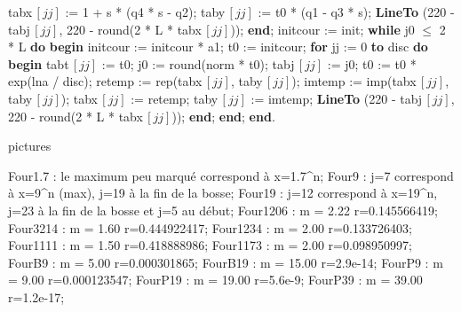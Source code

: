 {   tabx$\, [jj]$ := 1 + s * (q4 * s - q2);
   taby$\, [jj]$ := t0 * (q1 - q3 * s);
   {\bf LineTo} (220 - tabj$\, [jj]$, 220 - round(2 * L * tabx$\, [jj]$));
  {\bf end};
\medskip
 initcour := init;
\medskip
 {\bf while} j0 $\leq$ 2 * L {\bf do}
\smallskip
  {\bf begin}
   initcour := initcour * a1;
   t0 := initcour;
   {\bf for} jj := 0 {\bf to} disc {\bf do}
\smallskip
    {\bf begin}
     tabt$\, [jj]$ := t0;
     j0 := round(norm * t0);
     tabj$\, [jj]$ := j0;
     t0 := t0 * exp(lna / disc);
     retemp := rep(tabx$\, [jj]$, taby$\, [jj]$);
     imtemp := imp(tabx$\, [jj]$, taby$\, [jj]$);
     tabx$\, [jj]$ := retemp;
     taby$\, [jj]$ := imtemp;
     {\bf LineTo} (220 - tabj$\, [jj]$, 220 - round(2 * L * tabx$\, [jj]$));
    {\bf end};
\medskip
  {\bf end};
\medskip
{\bf end}.

} %

\vfill\break




\bye

 pictures 

Four1.7  : le maximum peu marqu\'e correspond \`a x=1.7^n;
Four9  : j=7 correspond \`a x=9^n (max), j=19 \`a la fin de la bosse;
Four19  : j=12 correspond \`a x=19^n, j=23 \`a la fin de la bosse
et j=5 au d\'ebut;
Four1206  : m = 2.22    r=0.145566419;
Four3214  : m = 1.60    r=0.444922417;
Four1234  : m = 2.00    r=0.133726403;
Four1111  : m = 1.50    r=0.418888986;
Four1173  : m = 2.00    r=0.098950997;
FourB9    :   m = 5.00    r=0.000301865;
FourB19   :  m = 15.00  r=2.9e-14;
FourP9   :    m = 9.00    r=0.000123547;
FourP19  :   m = 19.00  r=5.6e-9;
FourP39  :   m = 39.00  r=1.2e-17;

